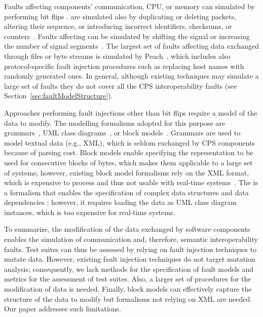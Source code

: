 Faults affecting components' communication, 
CPU, or memory can simulated by performing bit flips 
\cite{tsai1999stress,barton1990fault,han1995doctor,dawson1996testing}.
 are simulated also by duplicating or deleting packets, altering their sequence, or introducing incorrect identifiers, checksums, or counters~\cite{di2015evolutionary,di2015generating}.
Faults affecting  can be simulated by shifting the signal or increasing the number of signal segments~\cite{Matinnejad19}.
The largest set of faults affecting data exchanged through files or byte streams is simulated by Peach~\cite{PeachFuzzer}, which includes also protocol-specific fault injection procedures such as replacing host names with randomly generated ones.
In general, although existing techniques may simulate a large set of faults they do not cover all the CPS interoperability faults (see Section~\ref{sec:faultModelStructure}).

Approaches performing fault injections other than bit flips require a model of the data to modify.
The modelling formalisms adopted for this purpose are grammars~\cite{ghosh1998testing,Godefroid:GrammarBasedFuzzying:2008,godefroid2012sage,bounimova2013billions}, UML class diagrams~\cite{di2015evolutionary,di2015generating}, or block models~\cite{pham2016model,PeachFuzzer}.
Grammars are used to model textual data (e.g., XML), which is seldom exchanged by CPS components because of parsing cost. 
Block models enable specifying the representation to be used for consecutive blocks of bytes, which makes them applicable to a large set of systems; however, existing block model formalisms rely on the XML format, which is expensive to process and thus not usable with real-time systems~\cite{pham2016model,PeachFuzzer}.
The  is a formalism that
enables the specification of complex data structures and 
data dependencies 
\cite{di2015evolutionary,di2015generating}; however, it requires loading the data as UML class diagram instances, which is too expensive for real-time systems. 

To summarize, the modification of the data exchanged by software components enables the simulation of communication and, therefore, semantic interoperability faults.
Test suites can thus be assessed by relying on fault injection techniques to mutate data. 
However, existing fault injection techniques do not target mutation analysis; consequently, we lack methods for the specification of fault models and metrics for the assessment of test suites. 
Also, a larger set of procedures for the modification of data is needed.
Finally, block models can effectively capture the structure of the data to modify but formalisms not relying on XML are needed. Our paper addresses such limitations.

